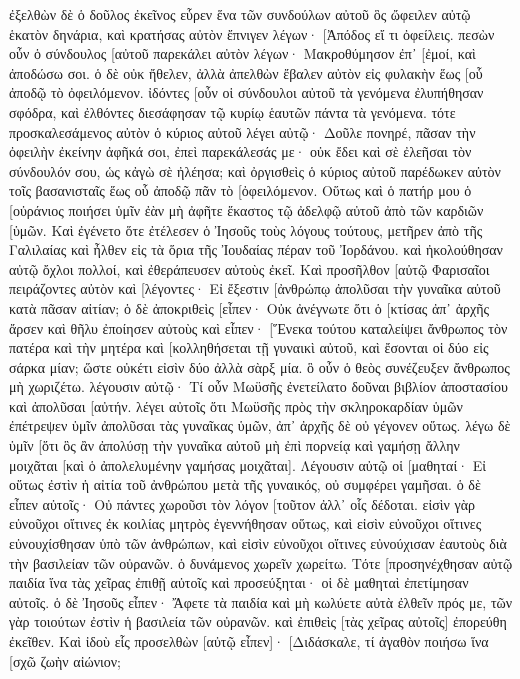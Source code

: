 ἐξελθὼν δὲ ὁ δοῦλος ἐκεῖνος εὗρεν ἕνα τῶν συνδούλων αὐτοῦ ὃς ὤφειλεν αὐτῷ ἑκατὸν δηνάρια, καὶ κρατήσας αὐτὸν ἔπνιγεν λέγων· [Ἀπόδος εἴ τι ὀφείλεις. 
πεσὼν οὖν ὁ σύνδουλος [αὐτοῦ παρεκάλει αὐτὸν λέγων· Μακροθύμησον ἐπ᾽ [ἐμοί, καὶ ἀποδώσω σοι. 
ὁ δὲ οὐκ ἤθελεν, ἀλλὰ ἀπελθὼν ἔβαλεν αὐτὸν εἰς φυλακὴν ἕως [οὗ ἀποδῷ τὸ ὀφειλόμενον. 
ἰδόντες [οὖν οἱ σύνδουλοι αὐτοῦ τὰ γενόμενα ἐλυπήθησαν σφόδρα, καὶ ἐλθόντες διεσάφησαν τῷ κυρίῳ ἑαυτῶν πάντα τὰ γενόμενα. 
τότε προσκαλεσάμενος αὐτὸν ὁ κύριος αὐτοῦ λέγει αὐτῷ· Δοῦλε πονηρέ, πᾶσαν τὴν ὀφειλὴν ἐκείνην ἀφῆκά σοι, ἐπεὶ παρεκάλεσάς με· 
οὐκ ἔδει καὶ σὲ ἐλεῆσαι τὸν σύνδουλόν σου, ὡς κἀγὼ σὲ ἠλέησα; 
καὶ ὀργισθεὶς ὁ κύριος αὐτοῦ παρέδωκεν αὐτὸν τοῖς βασανισταῖς ἕως οὗ ἀποδῷ πᾶν τὸ [ὀφειλόμενον. 
Οὕτως καὶ ὁ πατήρ μου ὁ [οὐράνιος ποιήσει ὑμῖν ἐὰν μὴ ἀφῆτε ἕκαστος τῷ ἀδελφῷ αὐτοῦ ἀπὸ τῶν καρδιῶν [ὑμῶν. 
Καὶ ἐγένετο ὅτε ἐτέλεσεν ὁ Ἰησοῦς τοὺς λόγους τούτους, μετῆρεν ἀπὸ τῆς Γαλιλαίας καὶ ἦλθεν εἰς τὰ ὅρια τῆς Ἰουδαίας πέραν τοῦ Ἰορδάνου. 
καὶ ἠκολούθησαν αὐτῷ ὄχλοι πολλοί, καὶ ἐθεράπευσεν αὐτοὺς ἐκεῖ. 
Καὶ προσῆλθον [αὐτῷ Φαρισαῖοι πειράζοντες αὐτὸν καὶ [λέγοντες· Εἰ ἔξεστιν [ἀνθρώπῳ ἀπολῦσαι τὴν γυναῖκα αὐτοῦ κατὰ πᾶσαν αἰτίαν; 
ὁ δὲ ἀποκριθεὶς [εἶπεν· Οὐκ ἀνέγνωτε ὅτι ὁ [κτίσας ἀπ᾽ ἀρχῆς ἄρσεν καὶ θῆλυ ἐποίησεν αὐτοὺς 
καὶ εἶπεν· [Ἕνεκα τούτου καταλείψει ἄνθρωπος τὸν πατέρα καὶ τὴν μητέρα καὶ [κολληθήσεται τῇ γυναικὶ αὐτοῦ, καὶ ἔσονται οἱ δύο εἰς σάρκα μίαν; 
ὥστε οὐκέτι εἰσὶν δύο ἀλλὰ σὰρξ μία. ὃ οὖν ὁ θεὸς συνέζευξεν ἄνθρωπος μὴ χωριζέτω. 
λέγουσιν αὐτῷ· Τί οὖν Μωϋσῆς ἐνετείλατο δοῦναι βιβλίον ἀποστασίου καὶ ἀπολῦσαι [αὐτήν. 
λέγει αὐτοῖς ὅτι Μωϋσῆς πρὸς τὴν σκληροκαρδίαν ὑμῶν ἐπέτρεψεν ὑμῖν ἀπολῦσαι τὰς γυναῖκας ὑμῶν, ἀπ᾽ ἀρχῆς δὲ οὐ γέγονεν οὕτως. 
λέγω δὲ ὑμῖν [ὅτι ὃς ἂν ἀπολύσῃ τὴν γυναῖκα αὐτοῦ μὴ ἐπὶ πορνείᾳ καὶ γαμήσῃ ἄλλην μοιχᾶται [καὶ ὁ ἀπολελυμένην γαμήσας μοιχᾶται]. 
Λέγουσιν αὐτῷ οἱ [μαθηταί· Εἰ οὕτως ἐστὶν ἡ αἰτία τοῦ ἀνθρώπου μετὰ τῆς γυναικός, οὐ συμφέρει γαμῆσαι. 
ὁ δὲ εἶπεν αὐτοῖς· Οὐ πάντες χωροῦσι τὸν λόγον [τοῦτον ἀλλ᾽ οἷς δέδοται. 
εἰσὶν γὰρ εὐνοῦχοι οἵτινες ἐκ κοιλίας μητρὸς ἐγεννήθησαν οὕτως, καὶ εἰσὶν εὐνοῦχοι οἵτινες εὐνουχίσθησαν ὑπὸ τῶν ἀνθρώπων, καὶ εἰσὶν εὐνοῦχοι οἵτινες εὐνούχισαν ἑαυτοὺς διὰ τὴν βασιλείαν τῶν οὐρανῶν. ὁ δυνάμενος χωρεῖν χωρείτω. 
Τότε [προσηνέχθησαν αὐτῷ παιδία ἵνα τὰς χεῖρας ἐπιθῇ αὐτοῖς καὶ προσεύξηται· οἱ δὲ μαθηταὶ ἐπετίμησαν αὐτοῖς. 
ὁ δὲ Ἰησοῦς εἶπεν· Ἄφετε τὰ παιδία καὶ μὴ κωλύετε αὐτὰ ἐλθεῖν πρός με, τῶν γὰρ τοιούτων ἐστὶν ἡ βασιλεία τῶν οὐρανῶν. 
καὶ ἐπιθεὶς [τὰς χεῖρας αὐτοῖς] ἐπορεύθη ἐκεῖθεν. 
Καὶ ἰδοὺ εἷς προσελθὼν [αὐτῷ εἶπεν]· [Διδάσκαλε, τί ἀγαθὸν ποιήσω ἵνα [σχῶ ζωὴν αἰώνιον; 
